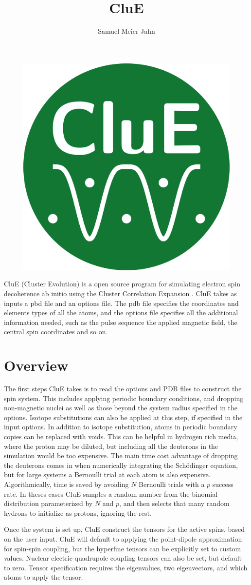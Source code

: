 \documentclass{book}
\title{CluE}
\author{Samuel Meier Jahn}
\begin{document}
%
\begin{figure} [H]
	\centering
	\includegraphics[width=0.25\linewidth]{figs/fig_CluE_logo.png}
  \label{fig:clue_logo}
\end{figure}
%
CluE (Cluster Evolution) is a open source program for simulating electron spin 
decoherence ab initio using the Cluster Correlation Expansion 
\cite{2008_Yang_Liu,2009_Yang_Liu}.  
CluE takes as inputs a pbd file and an options file.
The pdb file specifies the coordinates and elements types of all the atoms, 
and the options file specifies all the additional information needed, 
such as the pulse sequence the applied magnetic field, the central spin
coordinates and so on.
\section{Overview}
The first steps CluE takes is to read the options and PDB files to construct
the spin system.  This includes applying periodic boundary conditions, and
dropping non-magnetic nuclei as well as those beyond the system radius 
specified in the options.  Isotope substitutions can also be applied at this
step, if specified in the input options.  In addition to isotope substitution,
atoms in periodic boundary copies can be replaced with voids.  
This can be helpful in hydrogen rich media,
where the proton may be diluted, but including all the deuterons in the
simulation would be too expensive.  The main time cost advantage of dropping 
the deuterons comes in when numerically integrating the Sch{\"o}dinger 
equation, but for large systems a Bernoulli trial at each atom is also
expensive.  Algorithmically, time is saved by avoiding $N$ Bernoulli trials
with a $p$ success rate.  In theses cases CluE samples a random
number from the binomial distribution parameterized by $N$ and $p$, and then 
selects that many random hydrons to initialize as protons, ignoring the rest.     

Once the system is set up, CluE construct the tensors for the active spins,
based on the user input.  CluE will default to applying the point-dipole 
approximation for spin-spin coupling, but the hyperfine tensors can be 
explicitly set to custom values.  
Nuclear electric quadrupole coupling tensors can also be set, but default to 
zero.  Tensor specification requires the eigenvalues, two eigenvectors,
and which atoms to apply the tensor.
\end{document}
